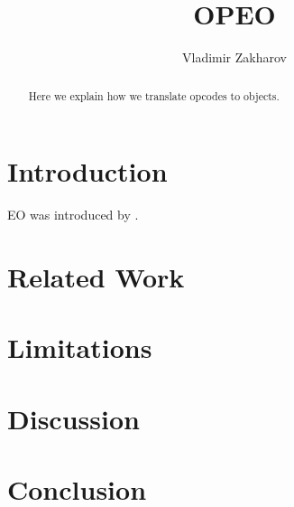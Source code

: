 \documentclass[11pt,nonacm,anonymous,review]{acmart}
\title{OPEO}
\author{Vladimir Zakharov}
\affiliation{Huawei\city{Moscow}\country{Russia}}
\begin{document}
\raggedbottom

\begin{abstract}
Here we explain how we translate opcodes to objects.
\end{abstract}

\maketitle

\section{Introduction}\label{sec:introduction}

EO was introduced by \citet{bugayenko2021eolang}.

\section{Related Work}\label{sec:related}

\section{Limitations}\label{sec:limitations}

\section{Discussion}\label{sec:discussion}

\section{Conclusion}\label{sec:conclusion}

{\raggedright

}
\vfill\eject
\end{document}
